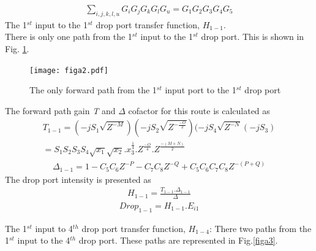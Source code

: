 \documentclass{osa-article}
\begin{document}
\begin{equation}
\begin{split}
\sum_{i,j,k,l,u} {G_i G_j G_kG_lG_u}=G_1G_2G_3G_4G_5 
\label{eqa46}
\end{split}
\end{equation}
The 1$^{st}$ input to the 1$^{st}$ drop port transfer function, $H_{1-1}$.\\

There is only one path from the 1$^{st}$ input to the 1$^{st}$ drop port. This is shown in Fig. \ref{figa2}.\\
  \begin{figure}[tb]
\centering
\texttt{[image: figa2.pdf]}
	\caption{The only forward path from the 1$^{st}$ input port to the 1$^{st}$ drop port}
	\label{figa2}
\end{figure} 
The forward path gain \textit {T} and $\Delta$ cofactor for this route is calculated as\\
\begin{equation}
\begin{split}
T_{1-1}=(-jS_{1}\sqrt{Z^{-M}})(-jS_{2}\sqrt{Z^{-\frac{-O}{2}}})(-jS_{4}\sqrt{Z^{-N}}(-jS_3)\\
=S_1S_2S_3S_4\sqrt{x_1}\sqrt{x_2}.{x^{\frac{1}{4}}_3}.Z^{\frac{-O}{4}}.Z^{\frac{-(M+N)}{2}}
\label{eqa47}
\end{split}
\end{equation}
\begin{equation}
\begin{split}
\Delta_{1-1}=1-C_5C_6Z^{-P}-C_7C_8Z^{-Q}+C_5C_6C_7C_8Z^{-(P+Q)}
\label{eqa48}
\end{split}
\end{equation}
The drop port intensity is presented as\\
\begin{equation}
\begin{split}
H_{1-1}=\frac{T_{1-1}.\Delta_{1-1}}{\Delta}
\label{eqa49}
\end{split}
\end{equation}
\begin{equation}
\begin{split}
Drop_{1-1}=H_{1-1}.E_{i1}
\label{eqa50}
\end{split}
\end{equation}

The 1$^{st}$ input to 4$^{th}$ drop port transfer function, $H_{1-4}$: 
There two paths from the 1$^{st}$ input to the 4$^{th}$ drop port. These paths are represented in Fig.\ref{figa3}.
\end{document}
